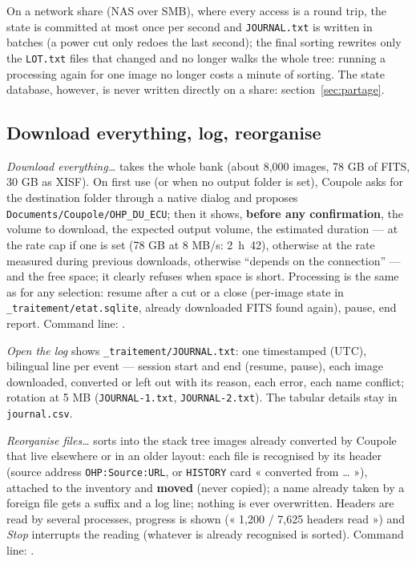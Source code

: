 On a network share (NAS over SMB), where every access is a round trip, the state is committed at most once per second
and \texttt{JOURNAL.txt} is written in batches (a power cut only redoes the last second); the final sorting rewrites
only the \texttt{LOT.txt} files that changed and no longer walks the whole tree: running a processing again for one
image no longer costs a minute of sorting.
The state database, however, is never written directly on a share: section~\ref{sec:partage}.

\subsection{Download everything, log, reorganise}\label{sec:tout}
\emph{Download everything…} takes the whole bank (about 8,000 images, 78 GB of FITS, 30 GB as XISF). On first use
(or when no output folder is set), Coupole asks for the destination folder through a native dialog and proposes
\texttt{Documents/Coupole/OHP\_DU\_ECU}; then it shows, \textbf{before any confirmation}, the volume to download,
the expected output volume, the estimated duration --- at the rate cap if one is set (78 GB at 8 MB/s: 2~h~42), otherwise at the rate measured
during previous downloads, otherwise ``depends on the connection'' --- and the free space; it
clearly refuses when space is short. Processing is the same as for any selection: resume after a cut or a close
(per-image state in \texttt{\_traitement/etat.sqlite}, already downloaded FITS found again), pause, end report.
Command line: .

\emph{Open the log} shows \texttt{\_traitement/JOURNAL.txt}: one timestamped (UTC), bilingual line per event ---
session start and end (resume, pause), each image downloaded, converted or left out with its reason, each error, each
name conflict; rotation at 5 MB (\texttt{JOURNAL-1.txt}, \texttt{JOURNAL-2.txt}). The tabular details stay in
\texttt{journal.csv}.

\emph{Reorganise files…} sorts into the stack tree images already converted by Coupole that live elsewhere or in an
older layout: each file is recognised by its header (source address \texttt{OHP:Source:URL}, or \texttt{HISTORY}
card « converted from … »), attached to the inventory and \textbf{moved} (never copied); a name already taken by a
foreign file gets a suffix and a log line; nothing is ever overwritten. Headers are read by several processes,
progress is shown (« 1,200 / 7,625 headers read ») and \emph{Stop} interrupts the reading (whatever is already
recognised is sorted). Command line: .

